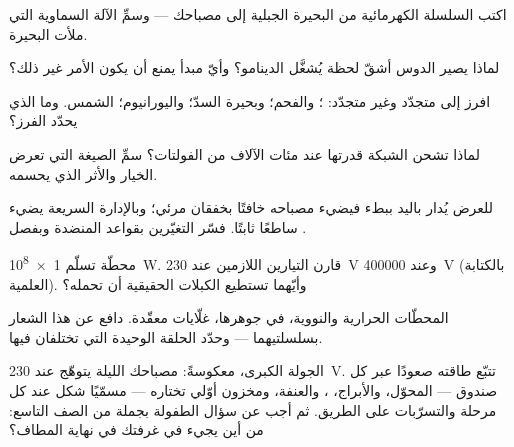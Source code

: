 \begin{exercise}[$\star$]\label{exo:g9:alternator:5}
اكتب السلسلة الكهرمائية من البحيرة الجبلية إلى مصباحك ---
وسمِّ الآلة السماوية التي ملأت البحيرة.
\end{exercise}

\begin{exercise}[$\star$]\label{exo:g9:alternator:6}
لماذا يصير الدوس أشقّ لحظة يُشغَّل  الدينامو؟ وأيّ مبدأ
يمنع أن يكون الأمر غير ذلك؟
\end{exercise}

\begin{exercise}[$\star$]\label{exo:g9:alternator:7}
افرز إلى متجدّد وغير متجدّد: ؛ والفحم؛ وبحيرة السدّ؛
واليورانيوم؛  الشمس. وما الذي يحدّد الفرز؟
\end{exercise}

\begin{exercise}[$\star$]\label{exo:g9:alternator:8}
لماذا تشحن الشبكة قدرتها عند مئات الآلاف من الفولتات؟ سمِّ
الصيغة التي تعرض الخيار والأثر الذي يحسمه.
\end{exercise}

\begin{exercise}[$\star\star$]\label{exo:g9:alternator:9}
 للعرض يُدار باليد ببطء فيضيء مصباحه خافتًا بخفقان
مرئي؛ وبالإدارة السريعة يضيء ساطعًا ثابتًا. فسّر التغيّرين
بقواعد المنضدة وبفصل .
\end{exercise}

\begin{exercise}[$\star\star$]\label{exo:g9:alternator:10}
محطّة تسلّم \qty{1e8}{W}. قارن التيارين اللازمين عند
\qty{230}{V} وعند \qty{400000}{V} (بالكتابة العلمية). وأيّهما
تستطيع الكبلات الحقيقية أن تحمله؟
\end{exercise}

\begin{exercise}[$\star\star$]\label{exo:g9:alternator:11}
المحطّات الحرارية والنووية، في جوهرها، غلّايات معقّدة. دافع عن
هذا الشعار بسلسلتيهما --- وحدّد الحلقة الوحيدة التي تختلفان
فيها.
\end{exercise}

\begin{exercise}[$\star\star\star$]\label{exo:g9:alternator:12}
الجولة الكبرى، معكوسةً: مصباحك الليلة يتوهّج عند \qty{230}{V}.
تتبّع طاقته صعودًا عبر كل صندوق --- المحوّل، والأبراج، ، والعنفة، ومخزون أوّلي تختاره --- مسمّيًا شكل 
عند كل مرحلة والتسرّبات على الطريق. ثم أجب عن سؤال الطفولة
بجملة من الصف التاسع: من أين يجيء  في غرفتك في نهاية
المطاف؟
\end{exercise}

